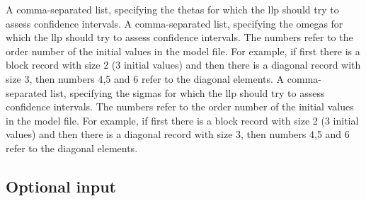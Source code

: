 \begin{optionlist}
A comma-separated list, specifying the thetas for which the llp should try to assess confidence intervals. 
\nextopt
{}
A comma-separated list, specifying the omegas for which the llp should try to assess confidence intervals. 
The numbers refer to the order number of the initial values in the model file. For example, if first there is 
a block record with size 2 (3 initial values) and then there is a diagonal record with size 3, then
numbers 4,5 and 6 refer to the diagonal elements.
\nextopt
{}
A comma-separated list, specifying the sigmas for which the llp should try to assess confidence intervals. 
The numbers refer to the order number of the initial values in the model file. For example, if first there is 
a block record with size 2 (3 initial values) and then there is a diagonal record with size 3, then
numbers 4,5 and 6 refer to the diagonal elements.
\nextopt
\end{optionlist}

\subsection{Optional input}

